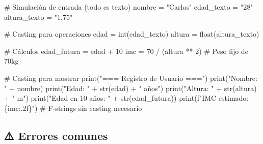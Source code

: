 \documentclass[
  doc,
  floatsintext,
  longtable,
  a4paper,
  nolmodern,
  notxfonts,
  notimes,
  12pt,
  colorlinks=true,linkcolor=blue,citecolor=blue,urlcolor=blue]{apa7}
\newenvironment{Shaded}{\begin{snugshade}}{\end{snugshade}}
\newcommand{\BuiltInTok}[1]{\textcolor[rgb]{0.00,0.23,0.31}{#1}}
\newcommand{\CommentTok}[1]{\textcolor[rgb]{0.37,0.37,0.37}{#1}}
\newcommand{\DecValTok}[1]{\textcolor[rgb]{0.68,0.00,0.00}{#1}}
\newcommand{\NormalTok}[1]{\textcolor[rgb]{0.00,0.23,0.31}{#1}}
\newcommand{\OperatorTok}[1]{\textcolor[rgb]{0.37,0.37,0.37}{#1}}
\newcommand{\SpecialCharTok}[1]{\textcolor[rgb]{0.37,0.37,0.37}{#1}}
\newcommand{\SpecialStringTok}[1]{\textcolor[rgb]{0.13,0.47,0.30}{#1}}
\newcommand{\StringTok}[1]{\textcolor[rgb]{0.13,0.47,0.30}{#1}}
\begin{document}
\begin{Shaded}
\begin{Highlighting}[]
\CommentTok{\# Simulación de entrada (todo es texto)}
\NormalTok{nombre }\OperatorTok{=} \StringTok{"Carlos"}
\NormalTok{edad\_texto }\OperatorTok{=} \StringTok{"28"}
\NormalTok{altura\_texto }\OperatorTok{=} \StringTok{"1.75"}

\CommentTok{\# Casting para operaciones}
\NormalTok{edad }\OperatorTok{=} \BuiltInTok{int}\NormalTok{(edad\_texto)}
\NormalTok{altura }\OperatorTok{=} \BuiltInTok{float}\NormalTok{(altura\_texto)}

\CommentTok{\# Cálculos}
\NormalTok{edad\_futura }\OperatorTok{=}\NormalTok{ edad }\OperatorTok{+} \DecValTok{10}
\NormalTok{imc }\OperatorTok{=} \DecValTok{70} \OperatorTok{/}\NormalTok{ (altura }\OperatorTok{**} \DecValTok{2}\NormalTok{)  }\CommentTok{\# Peso fijo de 70kg}

\CommentTok{\# Casting para mostrar}
\BuiltInTok{print}\NormalTok{(}\StringTok{"=== Registro de Usuario ==="}\NormalTok{)}
\BuiltInTok{print}\NormalTok{(}\StringTok{"Nombre: "} \OperatorTok{+}\NormalTok{ nombre)}
\BuiltInTok{print}\NormalTok{(}\StringTok{"Edad: "} \OperatorTok{+} \BuiltInTok{str}\NormalTok{(edad) }\OperatorTok{+} \StringTok{" años"}\NormalTok{)}
\BuiltInTok{print}\NormalTok{(}\StringTok{"Altura: "} \OperatorTok{+} \BuiltInTok{str}\NormalTok{(altura) }\OperatorTok{+} \StringTok{" m"}\NormalTok{)}
\BuiltInTok{print}\NormalTok{(}\StringTok{"Edad en 10 años: "} \OperatorTok{+} \BuiltInTok{str}\NormalTok{(edad\_futura))}
\BuiltInTok{print}\NormalTok{(}\SpecialStringTok{f"IMC estimado: }\SpecialCharTok{\{}\NormalTok{imc}\SpecialCharTok{:.2f\}}\SpecialStringTok{"}\NormalTok{)  }\CommentTok{\# F{-}strings sin casting necesario}
\end{Highlighting}
\end{Shaded}

\subsection{⚠️ Errores comunes}\label{errores-comunes}
\end{document}
